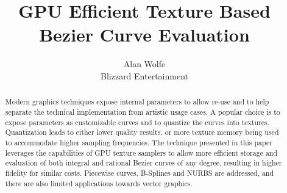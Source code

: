 \documentclass{jcgt}
\begin{document}
\usetikzlibrary{arrows.meta}

\title{GPU Efficient Texture Based Bezier Curve Evaluation}

\author
       {Alan Wolfe\\Blizzard Entertainment}


\maketitle
\thispagestyle{firstpagestyle}

\begin{abstract}
\small
Modern graphics techniques expose internal parameters to allow re-use and to help separate the technical implementation from artistic usage cases.  A popular choice is to expose parameters as customizable curves and to quantize the curves into textures.  Quantization leads to either lower quality results, or more texture memory being used to accommodate higher sampling frequencies.  The technique presented in this paper leverages the capabilities of GPU texture samplers to allow more efficient storage and evaluation of both integral and rational Bezier curves of any degree, resulting in higher fidelity for similar costs.  Piecewise curves, B-Splines and NURBS are addressed, and there are also limited applications towards vector graphics.
\end{abstract}
\end{document}
